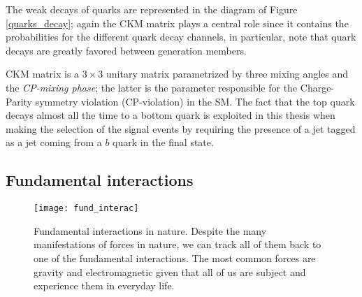 The weak decays of quarks are represented in the diagram of Figure \ref{quarks_decay}; again the CKM matrix plays a central role since it contains the probabilities for the different quark decay channels, in particular, note that quark decays are greatly favored between generation members.

CKM matrix is a $3\times3$ unitary matrix parametrized by three mixing angles and the \textit{CP-mixing phase}; the latter is the parameter responsible for the Charge-Parity symmetry violation (CP-violation) in the SM. The fact that the top quark decays almost all the time to a bottom quark is exploited in this thesis when making the selection of the signal events by requiring the presence of a jet tagged as a jet coming from a $b$ quark in the final state.%

\subsection{Fundamental interactions}\label{fund_inter}

\begin{figure}[h!]
  \centering
  \texttt{[image: fund\_interac]}
  \caption[Fundamental interactions in nature.]{Fundamental interactions in nature. Despite the many manifestations of forces in nature, we can track all of them back to one of the fundamental interactions. The most common forces are gravity and electromagnetic given that all of us are subject and experience them in everyday life.}
  \label{fund_interac}
\end{figure}


